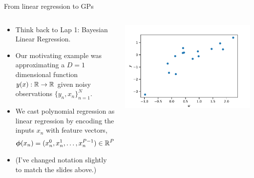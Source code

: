 \documentclass[aspectratio=169]{beamer}
\begin{document}
\begin{frame}{From linear regression to GPs}
\begin{columns}
\begin{column}{.5\textwidth}
\begin{itemize}
\item Think back to Lap 1: Bayesian Linear Regression. 

\item Our motivating example was approximating a $D=1$ dimensional function $y(x): \mathbb{R} \to \mathbb{R}$ given noisy observations $\{y_n, x_n\}_{n=1}^N$. 

\item We cast polynomial regression as linear regression by encoding the inputs $x_n$ with feature vectors,
\begin{align}
    \boldsymbol{\phi}(x_n) = (x_n^0, x_n^1, \ldots, x_n^{P-1}) \in \mathbb{R}^{P}.
\end{align}

\item (I've changed notation slightly to match the slides above.)
\end{itemize}
\end{column}

\begin{column}{0.5\textwidth}
    \centering
    \includegraphics[width=\linewidth]{figures/lap1/data.pdf}
\end{column}
\end{columns}

\end{frame}
\end{document}
